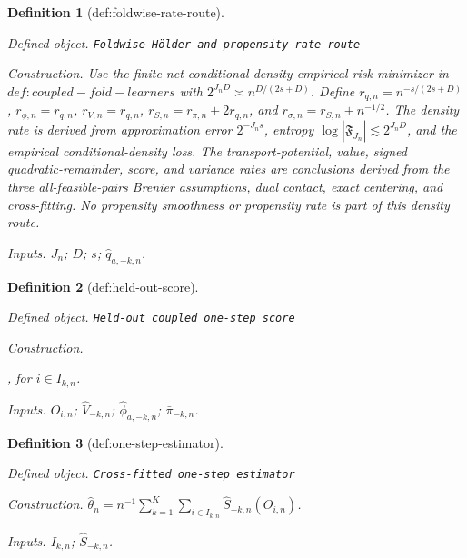 \documentclass{article}
\newtheorem{definition}{Definition}
\begin{document}
\begin{definition}[def:foldwise-rate-route]\label{def:foldwise-rate-route}
\par\smallskip\noindent\emph{Defined object.} \texttt{Foldwise Hölder and propensity rate route}
\par\smallskip\noindent\emph{Construction.} Use the finite-net conditional-density empirical-risk minimizer in \(def:coupled-fold-learners\) with \(2^{J_nD}\asymp n^{D/(2s+D)}\). Define \(r_{q,n}=n^{-s/(2s+D)}\), \(r_{\phi,n}=r_{q,n}\), \(r_{V,n}=r_{q,n}\), \(r_{S,n}=r_{\pi,n}+2r_{q,n}\), and \(r_{\sigma,n}=r_{S,n}+n^{-1/2}\). The density rate is derived from approximation error \(2^{-J_ns}\), entropy \(\log|\mathfrak F_{J_n}|\lesssim2^{J_nD}\), and the empirical conditional-density loss. The transport-potential, value, signed quadratic-remainder, score, and variance rates are conclusions derived from the three all-feasible-pairs Brenier assumptions, dual contact, exact centering, and cross-fitting. No propensity smoothness or propensity rate is part of this density route.
\par\smallskip\noindent\emph{Inputs.} \(J_n\); \(D\); \(s\); \(\widehat q_{a,-k,n}\).
\end{definition}

\begin{definition}[def:held-out-score]\label{def:held-out-score}
\par\smallskip\noindent\emph{Defined object.} \texttt{Held-\allowbreak{}out coupled one-\allowbreak{}step score}
\par\smallskip\noindent\emph{Construction.} \par\noindent {}\par\noindent, for \(i\in I_{k,n}\).
\par\smallskip\noindent\emph{Inputs.} \(O_{i,n}\); \(\widehat V_{-k,n}\); \(\widehat\phi_{a,-k,n}\); \(\bar\pi_{-k,n}\).
\end{definition}

\begin{definition}[def:one-step-estimator]\label{def:one-step-estimator}
\par\smallskip\noindent\emph{Defined object.} \texttt{Cross-\allowbreak{}fitted one-\allowbreak{}step estimator}
\par\smallskip\noindent\emph{Construction.} \(\widehat\theta_n=n^{-1}\sum_{k=1}^K\sum_{i\in I_{k,n}}\widehat S_{-k,n}(O_{i,n})\).
\par\smallskip\noindent\emph{Inputs.} \(I_{k,n}\); \(\widehat S_{-k,n}\).
\end{definition}
\end{document}
